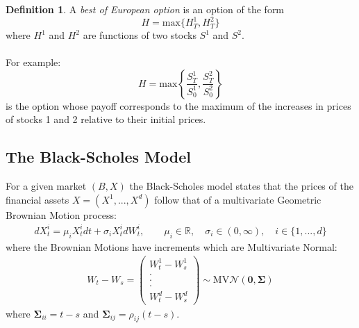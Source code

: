 \documentclass{article}
\theoremstyle{definition}
\newtheorem{definition}{Definition}[section]
\begin{document}
\begin{definition}
A \textit{best of European option} is an option of the form
$$H = \text{max}\{H^{1}_{T}, H^{2}_{T}\}$$
where $H^{1}$ and $H^{2}$ are functions of two stocks $S^{1}$ and $S^{2}$.\\\\
For example: $$H = \text{max}\left\{\frac{S^{1}_{T}}{S^{1}_{0}}, \frac{S^{2}_{T}}{S^{2}_{0}}\right\}$$
is the option whose payoff corresponds to the maximum of the increases in prices of stocks 1 and 2 relative to their initial prices. 
\end{definition}


\subsection{The Black-Scholes Model}
For a given market $(B,X)$ the Black-Scholes model states that the prices of the financial assets $X=(X^1,...,X^d)$ follow that of a multivariate Geometric Brownian Motion process:
\begin{align}
    dX_t^i = \mu_i X_t^i dt + \sigma_i X_t^i dW_t^i, \qquad \mu_i \in \mathbb{R}, \quad\sigma_i \in (0, \infty), \quad i \in \{1,...,d\}
\end{align}
where the Brownian Motions have increments which are Multivariate Normal:
\begin{align}
    W_t-W_s = \left(\begin{matrix}
        W^1_t-W^1_s\\
        .\\
        .\\
        .\\
        W^d_t-W^d_s
    \end{matrix}\right) \sim \text{MV}\mathcal{N}(\mathbf{0},\boldsymbol{\Sigma})
\end{align}
where $\boldsymbol{\Sigma}_{ii}=t-s$ and $\boldsymbol{\Sigma}_{ij}=\rho_{ij}(t-s)$.
\end{document}
